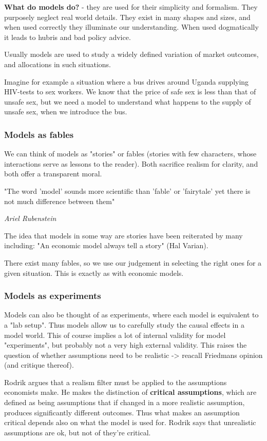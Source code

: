 \documentclass[12pt, a4paper]{article}
\begin{document}
\begin{multicols}{2}
\textbf{What do models do?} - they are used for their simplicity and formalism. They purposely neglect real world details. They exist in many shapes and sizes, and when used correctly they illuminate our understanding. When used dogmatically it leads to hubris and bad policy advice.

Usually models are used to study a widely defined variation of market outcomes, and allocations in such situations. 

Imagine for example a situation where a bus drives around Uganda supplying HIV-tests to sex workers. We know that the price of safe sex is less than that of unsafe sex, but we need a model to understand what happens to the supply of unsafe sex, when we introduce the bus. 

\subsubsection{Models as fables}
We can think of models as "stories" or fables (stories with few characters, whose interactions serve as lessons to the reader). Both sacrifice realism for clarity, and both offer a transparent moral.
\epigraph{"The word 'model' sounds more scientific than 'fable' or 'fairytale' yet there is not much difference between them"}{\textit{Ariel Rubenstein}}
The idea that models in some way are stories have been reiterated by many including: "An economic model always tell a story" (Hal Varian).

There exist many fables, so we use our judgement in selecting the right ones for a given situation. This is exactly as with economic models. 

\subsubsection{Models as experiments}
Models can also be thought of as experiments, where each model is equivalent to a "lab setup". Thus models allow us to carefully study the causal effects in a model world. This of course implies a lot of internal validity for model "experiments", but probably not a very high external validity. 
This raises the question of whether assumptions need to be realistic -> reacall Friedmans opinion (and critique thereof).

Rodrik argues that a realism filter must be applied to the assumptions economists make. He makes the distinction of \textbf{critical assumptions}, which are defined as being assumptions that if changed in a more realistic assumption, produces significantly different outcomes. Thus what makes an assumption critical depends also on what the model is used for. Rodrik says that unrealistic assumptions are ok, but not of they're critical.


\end{multicols}
\end{document}

